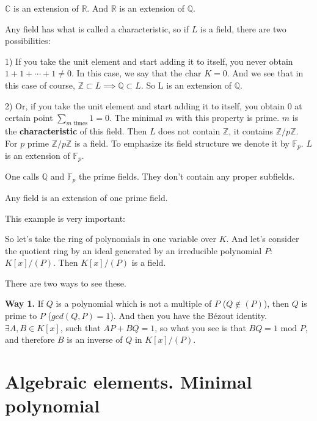 \begin{example}
$\mathbb{C}$ is an extension of $\mathbb{R}$. And $\mathbb{R}$ is an extension of $\mathbb{Q}$. 
\end{example}

\begin{example}
Any field has what is called a characteristic, so if $L$ is a field, there are two possibilities: 

1) If you take the unit element and start adding it to itself, you never obtain $1+1+\cdots +1 \neq 0$. In this case, we say that the $\text{char }K = 0$. And we see that in this case of course, $\mathbb{Z} \subset L \implies \mathbb{Q} \subset L$. So L is an extension of $\mathbb{Q}$.

2) Or, if you take the unit element and start adding it to itself, you obtain 0 at certain point $\sum_{m\text{ times}} 1 = 0$. The minimal $m$ with this property is prime. $m$ is the \textbf{characteristic} of this field. Then $L$ does not contain $\mathbb{Z}$, it contains $\mathbb{Z}/p\mathbb{Z}$. For $p$ prime $\mathbb{Z}/p\mathbb{Z}$ is a field. To emphasize its field structure we denote it by $\mathbb{F}_p$. $L$ is an extension of $\mathbb{F}_p$.

One calls $\mathbb{Q}$ and $\mathbb{F}_p$ the prime fields. They don't contain any proper subfields.

Any field is an extension of one prime field.
\end{example}

This example is very important:
\begin{example}
So let's take the ring of polynomials in one variable over $K$. And let's consider the quotient ring by an ideal generated by an irreducible polynomial $P$: $K[x]/(P)$. Then $K[x]/(P)$ is a field. 

There are two ways to see these. 

\textbf{Way 1.} If $Q$ is a polynomial which is not a multiple of $P$ ($Q\notin (P)$), then $Q$ is prime to $P$ ($gcd(Q,P)=1$).  And then you have the Bézout identity. $\exists A,B \in K[x]$, such that $AP + BQ = 1$, so what you see is that $BQ = 1 \text{ mod }P$, and therefore $B$ is an inverse of $Q$ in $K[x]/(P)$.
\end{example}

\section{Algebraic elements. Minimal polynomial}

